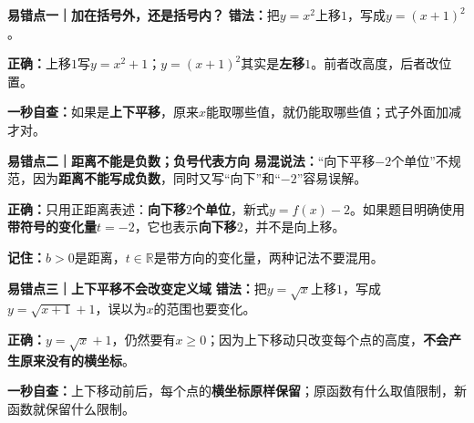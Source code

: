 \begin{trapbox}
  \textbf{\textcolor{CTrap}{易错点一｜加在括号外，还是括号内？}}
  \textbf{错法：}把$y=x^2$上移$1$，写成$y=(x+1)^2$。

  \textbf{正确：}上移$1$写$\boxed{y=x^2+1}$；$y=(x+1)^2$其实是\textbf{左移$1$}。前者改高度，后者改位置。
  \begin{center}
  
  \end{center}
  \textbf{一秒自查：}如果是\textbf{上下平移}，原来$x$能取哪些值，就仍能取哪些值；式子外面加减才对。

  \medskip
  \textbf{\textcolor{CTrap}{易错点二｜距离不能是负数；负号代表方向}}
  \textbf{易混说法：}“向下平移$-2$个单位”不规范，因为\textbf{距离不能写成负数}，同时又写“向下”和“$-2$”容易误解。

  \textbf{正确：}只用正距离表述：\textbf{向下移$2$个单位}，新式$y=f(x)-2$。如果题目明确使用\textbf{带符号的变化量}$t=-2$，它也表示\textbf{向下移$2$}，并不是向上移。
  \begin{center}
  
  \end{center}
  \textbf{记住：}$b>0$是距离，$t\in\mathbb R$是带方向的变化量，两种记法不要混用。

  \medskip
  \textbf{\textcolor{CTrap}{易错点三｜上下平移不会改变定义域}}
  \textbf{错法：}把$y=\sqrt{x}$上移$1$，写成$y=\sqrt{x+1}+1$，误以为$x$的范围也要变化。

  \textbf{正确：}$\boxed{y=\sqrt{x}+1}$，仍然要有$x\ge0$；因为上下移动只改变每个点的高度，\textbf{不会产生原来没有的横坐标}。
  \begin{center}
  
  \end{center}
  \textbf{一秒自查：}上下移动前后，每个点的\textbf{横坐标原样保留}；原函数有什么取值限制，新函数就保留什么限制。
\end{trapbox}
